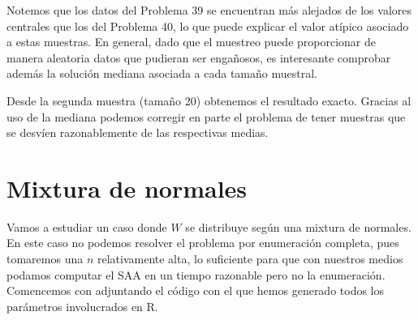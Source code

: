 \documentclass[twoside,a4paper,openright,12pt]{book}
\begin{document}
Notemos que los datos del Problema 39 se encuentran más alejados de los valores centrales que los del Problema 40, lo que puede explicar el valor atípico asociado a estas muestras. En general, dado que el muestreo puede proporcionar de manera aleatoria datos que pudieran ser engañosos, es interesante comprobar además la solución mediana asociada a cada tamaño muestral. 


Desde la segunda muestra (tamaño 20) obtenemos el resultado exacto. Gracias al uso de la mediana podemos corregir en parte el problema de tener muestras que se desvíen razonablemente de las respectivas medias.
\newpage

\section{Mixtura de normales}

Vamos a estudiar un caso donde $W$ se distribuye según una mixtura de normales. En este caso no podemos resolver el problema por enumeración completa, pues tomaremos una $n$ relativamente alta, lo suficiente para que con nuestros medios podamos computar el SAA en un tiempo razonable pero no la enumeración. Comencemos con adjuntando el código con el que hemos generado todos los parámetros involucrados en R.
\end{document}
